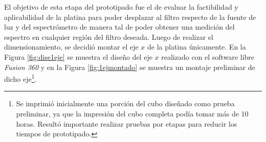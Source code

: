 El objetivo de esta etapa del prototipado fue el de evaluar la factibilidad y aplicabilidad de la platina para poder desplazar al filtro respecto de la fuente de luz y del espectrómetro de manera tal de poder obtener una medición del espectro en cualquier región del filtro deseada. Luego de realizar el dimensionamiento, se decidió montar el eje $\textit{x}$ de la platina únicamente. En la Figura \ref{fig:dise1eje} se muestra el diseño del eje $\textit{x}$ realizado con el software libre \textit{Fusion 360} y en la Figura \ref{fig:1ejmontado} se muestra un montaje preliminar de dicho eje\footnote{Se imprimió inicialmente una porción del cubo diseñado como prueba preliminar, ya que la impresión del cubo completa podía tomar más de 10 horas. Resultó importante realizar pruebas por etapas para reducir los tiempos de prototipado.}. 

